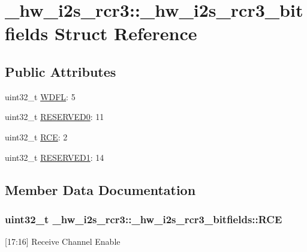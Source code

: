 \hypertarget{struct__hw__i2s__rcr3_1_1__hw__i2s__rcr3__bitfields}{}\section{\+\_\+hw\+\_\+i2s\+\_\+rcr3\+:\+:\+\_\+hw\+\_\+i2s\+\_\+rcr3\+\_\+bitfields Struct Reference}
\label{struct__hw__i2s__rcr3_1_1__hw__i2s__rcr3__bitfields}
\subsection*{Public Attributes}
\begin{DoxyCompactItemize}
\item 
uint32\+\_\+t \hyperlink{struct__hw__i2s__rcr3_1_1__hw__i2s__rcr3__bitfields_ad8d2f4ce6e4a5101d4ff6d4752ce76df}{W\+D\+FL}\+: 5
\item 
uint32\+\_\+t \hyperlink{struct__hw__i2s__rcr3_1_1__hw__i2s__rcr3__bitfields_a751da5da2da09be18b648b3281bdf331}{R\+E\+S\+E\+R\+V\+E\+D0}\+: 11
\item 
uint32\+\_\+t \hyperlink{struct__hw__i2s__rcr3_1_1__hw__i2s__rcr3__bitfields_ae16826b5222438b80a27b903e36a2783}{R\+CE}\+: 2
\item 
uint32\+\_\+t \hyperlink{struct__hw__i2s__rcr3_1_1__hw__i2s__rcr3__bitfields_a6dc0c9cc5cdbb9dfa1e69fc579737865}{R\+E\+S\+E\+R\+V\+E\+D1}\+: 14
\end{DoxyCompactItemize}


\subsection{Member Data Documentation}
\subsubsection[{\texorpdfstring{R\+CE}{RCE}}]{\setlength{\rightskip}{0pt plus 5cm}uint32\+\_\+t \+\_\+hw\+\_\+i2s\+\_\+rcr3\+::\+\_\+hw\+\_\+i2s\+\_\+rcr3\+\_\+bitfields\+::\+R\+CE}\hypertarget{struct__hw__i2s__rcr3_1_1__hw__i2s__rcr3__bitfields_ae16826b5222438b80a27b903e36a2783}{}\label{struct__hw__i2s__rcr3_1_1__hw__i2s__rcr3__bitfields_ae16826b5222438b80a27b903e36a2783}
\mbox{[}17\+:16\mbox{]} Receive Channel Enable 
